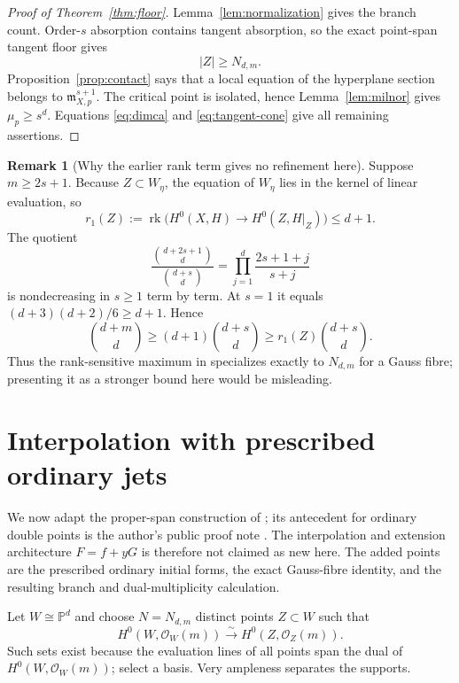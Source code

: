 \documentclass[11pt,a4paper]{article}
\theoremstyle{definition}
\newtheorem{remark}[theorem]{Remark}
\newcommand{\PP}{\mathbb P}
\newcommand{\cO}{\mathcal O}
\newcommand{\m}{\mathfrak m}
\begin{document}
\begin{proof}[Proof of Theorem~\ref{thm:floor}]
Lemma~\ref{lem:normalization} gives the branch count.  Order-$s$ absorption
contains tangent absorption, so the exact point-span tangent floor
\cite[Theorem~1.1]{ErikssonTangent2026} gives
\[
 |Z|\geq N_{d,m}.
\]
Proposition~\ref{prop:contact} says that a local equation of the hyperplane
section belongs to $\m_{X,p}^{s+1}$.  The critical point is isolated, hence
Lemma~\ref{lem:milnor} gives $\mu_p\geq s^d$.  Equations
\eqref{eq:dimca} and \eqref{eq:tangent-cone} give all remaining assertions.

\end{proof}

\begin{remark}[Why the earlier rank term gives no refinement here]
Suppose $m\geq2s+1$.  Because $Z\subset W_\eta$, the equation of $W_\eta$
lies in the kernel of linear evaluation, so
\[
 r_1(Z):=\operatorname{rk}\bigl(H^0(X,H)\to H^0(Z,H|_Z)\bigr)\leq d+1.
\]
The quotient
\[
 \frac{\binom{d+2s+1}{d}}{\binom{d+s}{d}}
 =\prod_{j=1}^d\frac{2s+1+j}{s+j}
\]
is nondecreasing in $s\geq1$ term by term.  At $s=1$ it equals
$(d+3)(d+2)/6\geq d+1$.  Hence
\[
 \binom{d+m}{d}\geq(d+1)\binom{d+s}{d}
 \geq r_1(Z)\binom{d+s}{d}.
\]
Thus the rank-sensitive maximum in
\cite[Theorem~1.3]{ErikssonOsculating2026} specializes exactly to
$N_{d,m}$ for a Gauss fibre; presenting it as a stronger bound here would be
misleading.
\end{remark}

\section{Interpolation with prescribed ordinary jets}

We now adapt the proper-span construction of
\cite{ErikssonOsculating2026}; its antecedent for ordinary double points is
the author's public proof note \cite{ErikssonB219}.  The interpolation and
extension architecture $F=f+yG$ is therefore not claimed as new here.  The
added points are the prescribed ordinary initial forms, the exact Gauss-fibre
identity, and the resulting branch and dual-multiplicity calculation.

Let $W\cong\PP^d$ and
choose $N=N_{d,m}$ distinct points $Z\subset W$ such that
\begin{equation}\label{eq:unisolvent}
 H^0(W,\cO_W(m))\xrightarrow{\sim}H^0(Z,\cO_Z(m)).
\end{equation}
Such sets exist because the evaluation lines of all points span the dual of
$H^0(W,\cO_W(m))$; select a basis.  Very ampleness separates the supports.
\end{document}
